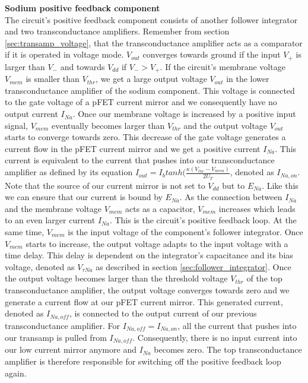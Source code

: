 \textbf{Sodium positive feedback component}\\

The circuit's positive feedback component consists of another follower integrator and two transconductance amplifiers. Remember from section \ref{sec:transamp_voltage}, that the transconductance amplifier acts as a comparator if it is operated in voltage mode. $V_{out}$ converges towards ground if the input $V_+$ is larger than $V_-$ and towards $V_{dd}$ if $V_- > V_+$. If the circuit's membrane voltage $V_{mem}$ is smaller than $V_{thr}$, we get a large output voltage $V_{out}$ in the lower transconductance amplifier of the sodium component. This voltage is connected to the gate voltage of a pFET current mirror and we consequently have no output current $I_{Na}$. Once our membrane voltage is increased by a positive input signal, $V_{mem}$ eventually becomes larger than $V_{thr}$ and the output voltage $V_{out}$ starts to converge towards zero. This decrease of the gate voltage generates a current flow in the pFET current mirror and we get a positive current $I_{Na}$. This current is equivalent to the current that pushes into our transconductance amplifier as defined by its equation $I_{out} = I_b tanh(\frac{\kappa (V_{thr} - V_{mem})}{2 U_T}$, denoted as $I_{Na,on}$. Note that the source of our current mirror is not set to $V_{dd}$ but to $E_{Na}$. Like this we can ensure that our current is bound by $E_{Na}$. As the connection between $I_{Na}$ and the membrane voltage $V_{mem}$ acts as a capacitor, $V_{mem}$ increases which leads to an even larger current $I_{Na}$. This is the circuit's positive feedback loop. At the same time, $V_{mem}$ is the input voltage of the component's follower integrator. Once $V_{mem}$ starts to increase, the output voltage adapts to the input voltage with a time delay. This delay is dependent on the integrator's capacitance and its bias voltage, denoted as $V_{\tau Na}$ as described in section \ref{sec:follower_integrator}. Once the output voltage becomes larger than the threshold voltage $V_{thr}$ of the top transconductance amplifier, the output voltage converges towards zero and we generate a current flow at our pFET current mirror. This generated current, denoted as $I_{Na,off}$, is connected to the output current of our previous transconductance amplifier. For $I_{Na,off} = I_{Na,on}$, all the current that pushes into our transamp is pulled from $I_{Na,off}$. Consequently, there is no input current into our low current mirror anymore and $I_{Na}$ becomes zero. The top transconductance amplifier is therefore responsible for switching off the positive feedback loop again.\\

